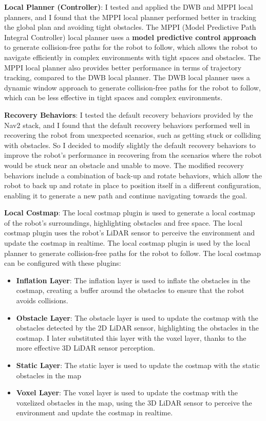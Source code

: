 \textbf{Local Planner (Controller)}:
I tested and applied the DWB and MPPI local planners, and I found that the MPPI local planner performed better
in tracking the global plan and avoiding tight obstacles. The MPPI (Model Predictive Path Integral Controller) 
local planner uses a \textbf{model predictive control approach}
to generate collision-free paths for the robot to follow, which allows the robot to navigate efficiently in complex
environments with tight spaces and obstacles. The MPPI local planner also provides better performance in terms of
trajectory tracking, compared to the DWB local planner. The DWB local planner uses a dynamic window approach to generate
collision-free paths for the robot to follow, which can be less effective in tight spaces and complex environments.

\textbf{Recovery Behaviors}:
I tested the default recovery behaviors provided by the Nav2 stack, and I found that the default recovery behaviors
performed well in recovering the robot from unexpected scenarios, such as getting stuck or colliding with obstacles.
So I decided to modify slightly the default recovery behaviors to improve the robot's performance in recovering
from the scenarios where the robot would be stuck near an obstacle and unable to move. The modified recovery behaviors
include a combination of back-up and rotate behaviors, which allow the robot to back up and rotate in place to position
itself in a different configuration, enabling it to generate a new path and continue navigating towards the goal.

\textbf{Local Costmap}:
The local costmap plugin is used to generate a local costmap of the robot's surroundings, highlighting obstacles
and free space. The local costmap plugin uses the robot's LiDAR sensor to perceive the environment and update the costmap
in realtime. The local costmap plugin is used by the local planner to generate collision-free paths for the robot
to follow. The local costmap can be configured with these plugins:

\begin{itemize}
    \item \textbf{Inflation Layer}: The inflation layer is used to inflate the obstacles in the costmap, creating a buffer
    around the obstacles to ensure that the robot avoids collisions.
    \item \textbf{Obstacle Layer}: The obstacle layer is used to update the costmap with the obstacles detected by
    the 2D LiDAR sensor, highlighting the obstacles in the costmap. I later substituted this layer with the voxel layer,
    thanks to the more effective 3D LiDAR sensor perception.
    \item \textbf{Static Layer}: The static layer is used to update the costmap with the static obstacles in the map
    \item \textbf{Voxel Layer}: The voxel layer is used to update the costmap with the voxelized obstacles in the map,
    using the 3D LiDAR sensor to perceive the environment and update the costmap in realtime.
\end{itemize}

